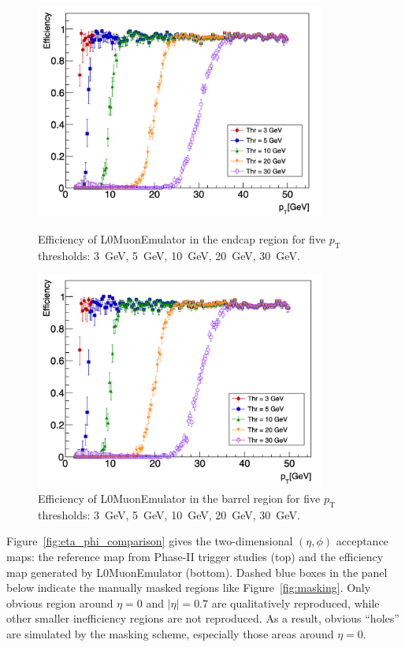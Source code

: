 \begin{figure}[htbp]
  \centering
  \includegraphics[width=0.85\textwidth]{figs/chapter4/efficiency_endcap_multi_right_new.png}
  \caption{Efficiency of L0MuonEmulator in the endcap region for five $p_\mathrm{T}$ thresholds: 3~GeV, 5~GeV, 10~GeV, 20~GeV, 30~GeV.}
  \label{fig:eff_pt_endcap}


  \includegraphics[width=0.85\textwidth]{figs/chapter4/efficiency_barrel_multi_right_new.png}
  \caption{Efficiency of L0MuonEmulator in the barrel region for five $p_\mathrm{T}$ thresholds: 3~GeV, 5~GeV, 10~GeV, 20~GeV, 30~GeV.}
  \label{fig:eff_pt_barrel}
\end{figure}

Figure~\ref{fig:eta_phi_comparison} gives the two-dimensional $(\eta, \phi)$ acceptance maps: the reference map from Phase-II trigger studies (top) and the efficiency map generated by L0MuonEmulator (bottom). Dashed blue boxes in the panel below indicate the manually masked regions like Figure~\ref{fig:masking}. Only obvious region around $\eta = 0$ and $|\eta| = 0.7$ are qualitatively reproduced, while other smaller inefficiency regions are not reproduced. As a result, obvious ``holes'' are simulated by the masking scheme, especially those areas around $\eta = 0$.

